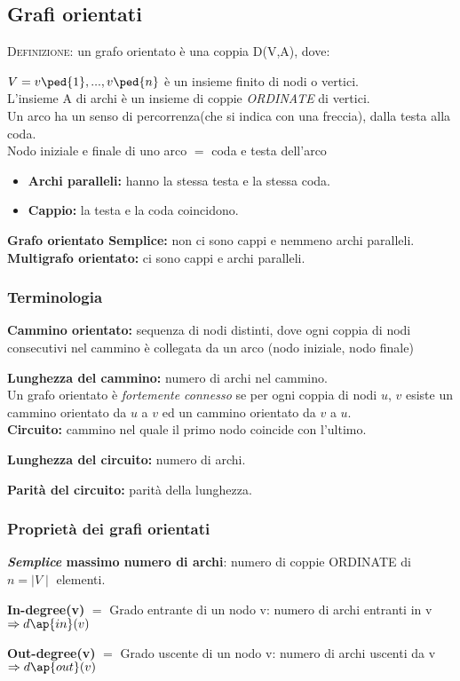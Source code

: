 \documentclass[12pt,a4paper]{article}
\begin{document}
\subsection{Grafi orientati}
\textsc{Definizione:} un grafo orientato è una coppia D(V,A), dove: \par
\( V={ v\ped{1}, ...,v\ped{n}} \) è un insieme finito di nodi o vertici. \\
L'insieme A di archi è un insieme di coppie \emph{ORDINATE} di vertici. \\
Un arco ha un senso di percorrenza(che si indica con una freccia), dalla testa alla coda. \\

Nodo iniziale e finale di uno arco $=$ coda e testa dell'arco\\
\begin{itemize}
\item \textbf{Archi paralleli:} hanno la stessa testa e la stessa coda.
\item \textbf{Cappio:} la testa e la coda coincidono.
\end{itemize}
\textbf{Grafo orientato Semplice:} non ci sono cappi e nemmeno archi paralleli.
\textbf{Multigrafo orientato:} ci sono cappi e archi paralleli. \\

\subsubsection{Terminologia}
\textbf{Cammino orientato:} sequenza di nodi distinti, dove ogni coppia di nodi consecutivi nel cammino è
collegata da un arco (nodo iniziale, nodo finale) \par
\textbf{Lunghezza del cammino:} numero di archi nel cammino. \\

Un grafo orientato è \textit{fortemente connesso} se per ogni coppia di nodi $u$, $v$ esiste un cammino orientato da $u$ a $v$ ed un cammino orientato da $v$ a $u$. \\

\textbf{Circuito:} cammino nel quale il primo nodo coincide con l'ultimo. \par
\textbf{Lunghezza del circuito:} numero di archi. \par
\textbf{Parità del circuito:} parità della lunghezza. \\

\subsubsection{Proprietà dei grafi orientati}
\textbf{\textit{Semplice} massimo numero di archi}: numero di coppie ORDINATE di \(n=\mid V \mid \) elementi. \par
\textbf{In-degree(v)} $=$ Grado entrante di un nodo v: numero di archi entranti in v \(\Rightarrow d\ap{in}(v)\) \par
\textbf{Out-degree(v)} $=$ Grado uscente di un nodo v: numero di archi uscenti da v \( \Rightarrow d\ap{out}(v) \)\\
\end{document}
